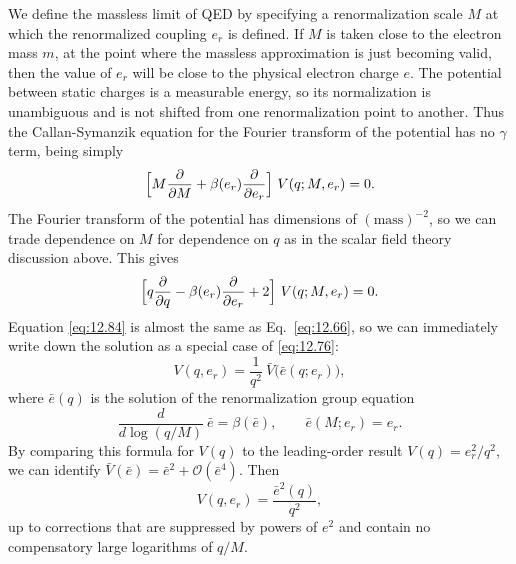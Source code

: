 We define the massless limit of QED by specifying a renormalization scale $M$
at which the renormalized coupling $e_r$ is defined.  If $M$ is taken close to
the electron mass $m$, at the point where the massless approximation is just
becoming valid, then the value of $e_r$ will be close to the physical electron
charge $e$.  The potential between static charges is a measurable energy, so
its normalization is unambiguous and is not shifted from one renormalization
point to another.  Thus the Callan-Symanzik equation for the Fourier
transform of the potential has no $\gamma$ term, being simply
\begin{equation}
  \Bigl[ M\frac{\partial}{\partial M} + \beta(e_r)\frac{\partial}
    {\partial e_r} \Bigr]\ V(q; M, e_r) = 0 .
  \label{eq:12.83}
\end{equation}
The Fourier transform of the potential has dimensions of $(\mathrm{mass})^{-2}$,
so we can trade dependence on $M$ for dependence on $q$ as in the scalar
field theory discussion above.  This gives
\begin{equation}
  \Bigl[ q\frac{\partial}{\partial q} - \beta(e_r)\frac{\partial}{\partial
    e_r} + 2 \Bigr]\ V(q; M, e_r) = 0 .
  \label{eq:12.84}
\end{equation}
Equation \eqref{eq:12.84} is almost the same as Eq.~\eqref{eq:12.66}, so we
can immediately write down the solution as a special case of
\eqref{eq:12.76}:
\begin{equation}
  V(q, e_r) = \frac{1}{q^2}\ \bar{V}\bigl( \bar{e}(q; e_r) \bigr) ,
  \label{eq:12.85}
\end{equation}
where $\bar{e}(q)$ is the solution of the renormalization group equation
\begin{equation}
  \frac{d}{d\log(q/M)}\ \bar{e} = \beta(\bar{e}),\qquad
  \bar{e}(M; e_r) = e_r .
  \label{eq:12.86}
\end{equation}
By comparing this formula for $V(q)$ to the leading-order result
$V(q) = e_r^2/q^2$, we can identify $\bar{V}(\bar{e}) = \bar{e}^2 +
\mathcal{O}(\bar{e}^4)$.  Then
\begin{equation}
  V(q, e_r) = \frac{\bar{e}^2(q)}{q^2} ,
  \label{eq:12.87}
\end{equation}
up to corrections that are suppressed by powers of $e^2$ and contain no
compensatory large logarithms of $q/M$.

